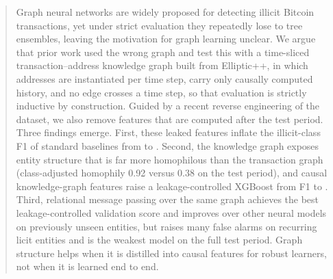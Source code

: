 \begin{abstract}
Graph neural networks are widely proposed for detecting illicit Bitcoin
transactions, yet under strict evaluation they repeatedly lose to tree
ensembles, leaving the motivation for graph learning unclear. We argue that
prior work used the wrong graph and test this with a time-sliced
transaction--address knowledge graph built from Elliptic++, in which addresses
are instantiated per time step, carry only causally computed history, and no
edge crosses a time step, so that evaluation is strictly inductive by
construction. Guided by a recent reverse engineering of the dataset, we also
remove features that are computed after the test period. Three findings
emerge. First, these leaked features inflate the illicit-class F1 of standard
baselines from \XgbCleanFone{} to \XgbAllFone{}. Second, the knowledge graph exposes
entity structure that is far more homophilous than the transaction graph
(class-adjusted homophily 0.92 versus 0.38 on the test period), and causal
knowledge-graph features raise a leakage-controlled XGBoost from F1
\XgbCleanFone{} to \XgbCleanKgFone{}. Third, relational message passing over the same graph achieves the best leakage-controlled
validation score and improves over other neural models on previously unseen
entities, but raises many false alarms on recurring licit entities and is the
weakest model on the full test period.
Graph structure helps when it is distilled into causal features for robust
learners, not when it is learned end to end.
\end{abstract}
